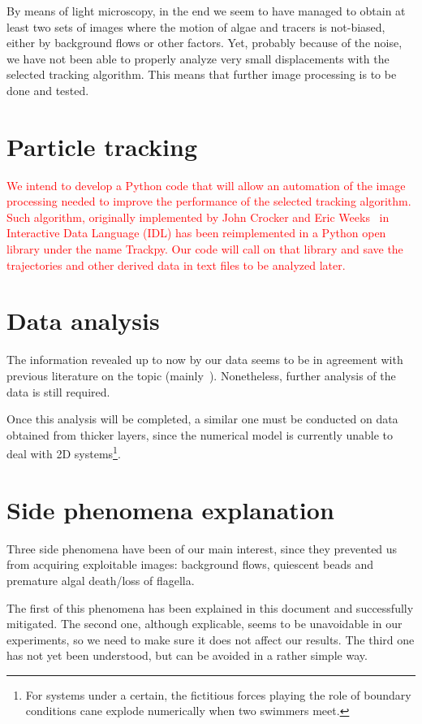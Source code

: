 By means of light microscopy, in the end we seem to have managed to obtain at least two sets of images where the motion of algae and tracers is not-biased, either by background flows or other factors. Yet, probably because of the noise, we have not been able to properly analyze very small displacements with the selected tracking algorithm. This means that further image processing is to be done and tested.

\section{Particle tracking}


\textcolor{red}{We intend to develop a Python code that will allow an automation of the image processing needed to improve the performance of the selected tracking algorithm. Such algorithm, originally implemented by John Crocker and Eric Weeks~\cite{Crocker} in Interactive Data Language (IDL) has been reimplemented in a Python
open library under the name Trackpy. Our code will call on that library and save the trajectories and other derived data in text files to be analyzed later.}

\section{Data analysis}

The information revealed up to now by our data seems to be in agreement with previous literature on the topic (mainly~\cite{Kurtuldu2011}). Nonetheless, further analysis of the data is still required. 

Once this analysis will be completed, a similar one must be conducted on data obtained from thicker layers, since the numerical model is currently unable to deal with 2D systems\footnote{For systems under a certain, the fictitious forces playing the role of boundary conditions cane explode numerically when two swimmers meet.}.

\section{Side phenomena explanation}

Three side phenomena have been of our main interest, since they prevented us from acquiring exploitable images: background flows, quiescent beads and premature algal death/loss of flagella.

The first of this phenomena has been explained in this document and successfully mitigated. The second one, although explicable, seems to be unavoidable in our experiments, so we need to make sure it does not affect our results. The third one has not yet been understood, but can be avoided in a rather simple way.

